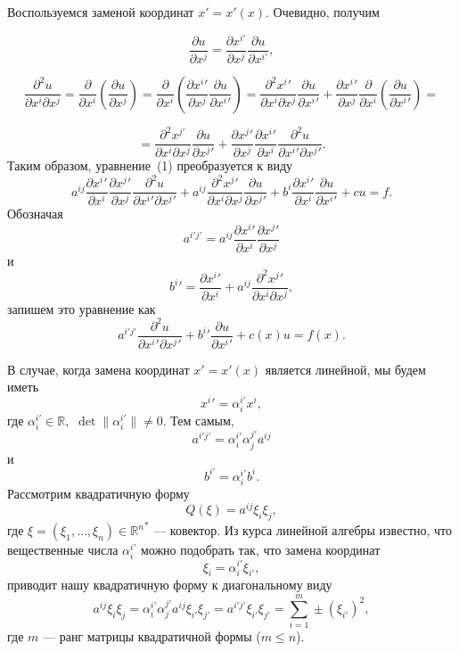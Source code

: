 \documentclass[12pt,a4paper,draft]{article}
\DeclareRobustCommand*{\т}{~--- }
\DeclareRobustCommand*{\ч}{~-- }
\begin{document}
Воспользуемся заменой координат $x'=x'(x)$. Очевидно, получим

$$\frac{\partial u}{\partial x^j}=\frac{\partial x^{i'}}{\partial x^j}\frac{\partial u}{\partial x^{i'}},$$

$$\frac{\partial^2 u}{\partial x^i \partial x^j}
=\frac{\partial}{\partial x^i} \left(\frac{\partial u}{\partial
x^j}\right) =\frac{\partial}{\partial x^i}\left(\frac{\partial
{x^{i}}'}{\partial x^j}\frac{\partial u}{\partial {x^{i}}'}\right)
=\frac{\partial^2 {x^{i}}'}{\partial x^i \partial
x^j}\frac{\partial u}{\partial {x^{i}}'}+\frac{\partial
{x^{i}}'}{\partial x^j}\frac{\partial }{\partial
x^i}\left(\frac{\partial u}{\partial {x^i}'}\right)=$$

$$=\frac{\partial^2 x^{j'}}{\partial x^i \partial
x^j}\frac{\partial u}{\partial {x^{j}}'}+\frac{\partial
{x^{j}}'}{\partial x^j}\frac{\partial {x^{i}}'}{\partial
x^i}\frac{\partial^2 u}{\partial {x^{i}}' \partial {x^{j}}'}.$$
Таким образом, уравнение~(1) преобразуется к виду
$$
    a^{ij}
    \frac{
        \partial {x^{i}}'
    }{
        \partial x^i
    }
    \frac{
        \partial {x^{j}}'
    }{
        \partial x^j
    }
    \frac{
        \partial^2 u
    }{
        \partial {x^{i}}' \partial {x^{j}}'
    }
    +
    a^{ij}
    \frac{
        \partial^2 {x^{j}}'
    }{
        \partial x^i \partial x^j
    }
    \frac{
        \partial u
    }{
        \partial {x^{j}}'
    }
    +
    b^i
    \frac{
        \partial {x^{i}}'
    }{
        \partial x^i
    }
    \frac{
        \partial u
    }{
        \partial {x^{i}}'
    }
    +
    c u
    =
    f.
$$
Обозначая
$$
    a^{i'j'}
    =
    a^{ij}
    \frac{
        \partial {x^{i}}'
    }{
        \partial x^i
    }
    \frac{
        \partial {x^{j}}'
    }{
        \partial x^j}
$$
и
$$
    {b^{i}}'
    =
    \frac{
        \partial {x^{i}}'
    }{
        \partial x^i
    }
    +
    a^{ij}
    \frac{
        \partial^2 {x^{j}}'
    }{
        \partial x^i \partial x^j
    },
$$
запишем это уравнение как
$$
    a^{i'j'}
    \frac{
        \partial^2 u
    }{
        \partial {x^{i}}' \partial {x^{j}}'
    }
    +
    {b^{i}}'
    \frac{
        \partial u
    }{
        \partial {x^{i}}'
    }
    +
    c(x) u
    = f(x).
$$

В случае, когда замена координат $x'=x'(x)$ является линейной, мы будем иметь
$$
    {x^{i}}'
    =
    \alpha_i^{i'}
    x^i,
$$
где
$
    \alpha_i^{i'}
    \in
    \mathbb R,
$
$
    \det  \| \alpha_i^{i'} \|
    \ne
    0.
$
Тем самым,
$$
    a^{i'j'}
    =
    \alpha_i^{i'}
    \alpha_j^{j'}
    a^{ij}
$$
и
$$
    b^{i'}
    =
    \alpha_i^{i'} b^i.
$$
Рассмотрим квадратичную форму
$$
    Q (\xi) =
    a^{ij} \xi_i \xi_j,
$$
где $\xi=(\xi_1,\ldots,\xi_n)\in {\mathbb R^n}^*$ ---  ковектор.
Из курса линейной алгебры известно, что вещественные числа
$\alpha_i^{i'}$ можно подобрать так, что замена координат
$$\xi_i=\alpha_i^{i'}\xi_{i'},$$
приводит нашу квадратичную форму к диагональному виду
$$a^{ij}\xi_i\xi_j=\alpha_i^{i'}\alpha_j^{j'}a^{ij}\xi_{i'}\xi_{j'}=a^{i'j'}\xi_{i'}\xi_{j'}=\sum_{i=1}^m
\pm (\xi_{i'})^2,$$
где $m$ --- ранг матрицы квадратичной формы ($m \le n$).
\end{document}
